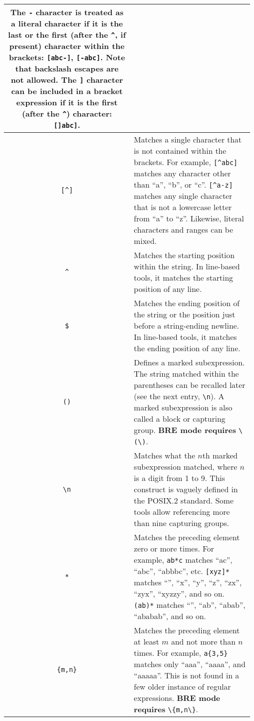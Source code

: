 \begin{tabularx}{\textwidth}{|c|X|}
  The \verb|-| character is treated as a literal character if it is the last
  or the first (after the \verb|^|, if present) character within the
  brackets: \verb|[abc-]|, \verb|[-abc]|. Note that backslash escapes are not
  allowed. The \verb|]| character can be included in a bracket expression if
  it is the first (after the \verb|^|) character: \verb|[]abc]|.\\
  \hline
  \verb|[^]| & Matches a single character that is not contained within the
  brackets. For example, \verb|[^abc]| matches any character other than
  ``a'', ``b'', or ``c''. \verb|[^a-z]| matches any single character that is
  not a lowercase letter from ``a'' to ``z''. Likewise, literal characters
  and ranges can be mixed.\\ \hline
  \verb|^| & Matches the starting position within the string. In line-based
  tools, it matches the starting position of any line.\\ \hline
  \verb|$| & Matches the ending position of the string or the position just
  before a string-ending newline. In line-based tools, it matches the ending
  position of any line.\\ \hline
  \verb|()| & Defines a marked subexpression. The string matched within the
  parentheses can be recalled later (see the next entry, \verb|\n|). A marked
  subexpression is also called a block or capturing group. \textbf{BRE mode
  requires} \verb|\(\)|.\\ \hline
  \verb|\n| & Matches what the $n$th marked subexpression matched,
  where $n$ is a digit from 1 to 9. This construct is vaguely defined
  in the POSIX.2 standard. Some tools allow referencing more than nine
  capturing groups.\\ \hline
  \verb|*| & Matches the preceding element zero or more times. For example,
  \verb|ab*c| matches ``ac'', ``abc'', ``abbbc'', etc. \verb|[xyz]*| matches
  ``'', ``x'', ``y'', ``z'', ``zx'', ``zyx'', ``xyzzy'', and so on.
  \verb|(ab)*| matches ``'', ``ab'', ``abab'', ``ababab'', and so on.\\
  \hline
  \verb|{m,n}| & Matches the preceding element at least $m$ and not
  more than $n$ times. For example, \verb|a{3,5}| matches only ``aaa'',
  ``aaaa'', and ``aaaaa''. This is not found in a few older instance of
  regular expressions. \textbf{BRE mode requires} \verb|\{m,n\}|.\\
  \hline
\end{tabularx}

